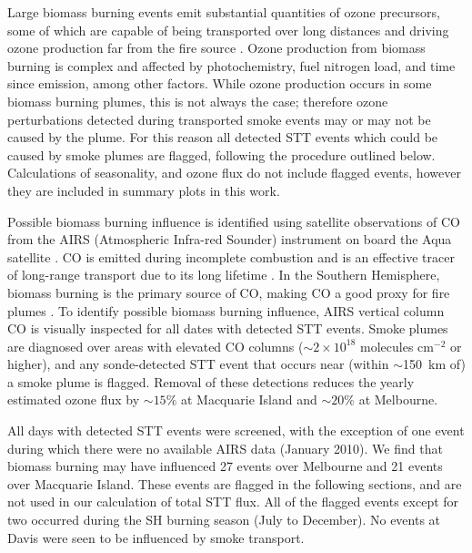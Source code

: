 \documentclass[acp, manuscript]{copernicus} %
\begin{document}
    Large biomass burning events emit substantial quantities of ozone precursors, some of which are capable of being transported over long distances and driving ozone production far from the fire source \citep{Jaffe2012}.
    Ozone production from biomass burning is complex and affected by photochemistry, fuel nitrogen load, and time since emission, among other factors. 
    While ozone production occurs in some biomass burning plumes, this is not always the case; therefore ozone perturbations detected during transported smoke events may or may not be caused by the plume.
    For this reason all detected STT events which could be caused by smoke plumes are flagged, following the procedure outlined below.
    Calculations of seasonality, and ozone flux do not include flagged events, however they are included in summary plots in this work.


    Possible biomass burning influence is identified using satellite observations of CO from the AIRS (Atmospheric Infra-red Sounder) instrument on board the Aqua satellite \citep{AIRS3STD}.
    CO is emitted during incomplete combustion and is an effective tracer of long-range transport due to its long lifetime \citep{Edwards2003, Edwards2006}.
    In the Southern Hemisphere, biomass burning is the primary source of CO, making CO a good proxy for fire plumes \citep[e.g.][]{Sinha2004, Mari2008}.
    To identify possible biomass burning influence, AIRS vertical column CO is visually inspected for all dates with detected STT events.
    Smoke plumes are diagnosed over areas with elevated CO columns ($\sim 2 \times 10^{18}$ molecules cm$^{-2}$ or higher), and any sonde-detected STT event that occurs near (within $\sim$150~km of) a smoke plume is flagged.
    Removal of these detections reduces the yearly estimated ozone flux by $\sim 15\%$ at Macquarie Island and $\sim 20\%$ at Melbourne.

    All days with detected STT events were screened, with the exception of one event during which there were no available AIRS data (January 2010).
    We find that biomass burning may have influenced 27 events over Melbourne and 21 events over Macquarie Island.
    These events are flagged in the following sections, and are not used in our calculation of total STT flux.
    All of the flagged events except for two occurred during the SH burning season (July to December). %
    No events at Davis were seen to be influenced by smoke transport.
\end{document}
